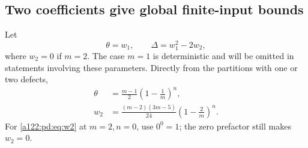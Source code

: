 \documentclass[11pt,letterpaper]{article}
\numberwithin{equation}{subsection}
\theoremstyle{definition}
\theoremstyle{remark}
\theoremstyle{plain}
\begin{document}
\subsection{Two coefficients give global finite-input bounds}
\label{a122:pd:sec:finite}
Let
\begin{equation}\label{a122:pd:eq:thetaDelta}
 \theta=w_1,\qquad \Delta=w_1^2-2w_2,
\end{equation}
where $w_2=0$ if $m=2$. The case $m=1$ is deterministic and will be
omitted in statements involving these parameters. Directly from the
partitions with one or two defects,
\begin{align}
 \theta&=\frac{m-1}{2}\left(1-\frac1m\right)^n,\label{a122:pd:eq:w1}\\
 w_2&=\frac{(m-2)(3m-5)}{24}\left(1-\frac2m\right)^n.
 \label{a122:pd:eq:w2}
\end{align}
For \eqref{a122:pd:eq:w2} at $m=2,n=0$, use $0^0=1$; the zero prefactor still
makes $w_2=0$.
\end{document}
